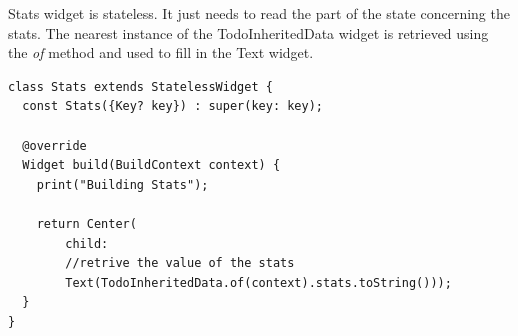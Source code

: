 Stats widget is stateless. It just needs to read the part of the state concerning the stats. The nearest instance of the TodoInheritedData widget is retrieved using the \textit{of} method and used to fill in the Text widget.
\mbox{}\\
\mbox{}
\begin{code}
\label{code:2.29}
\begin{verbatim}
class Stats extends StatelessWidget {
  const Stats({Key? key}) : super(key: key);

  @override
  Widget build(BuildContext context) {
    print("Building Stats");

    return Center(
        child:
        //retrive the value of the stats 
        Text(TodoInheritedData.of(context).stats.toString()));
  }
}
\end{verbatim}
\end{code}

